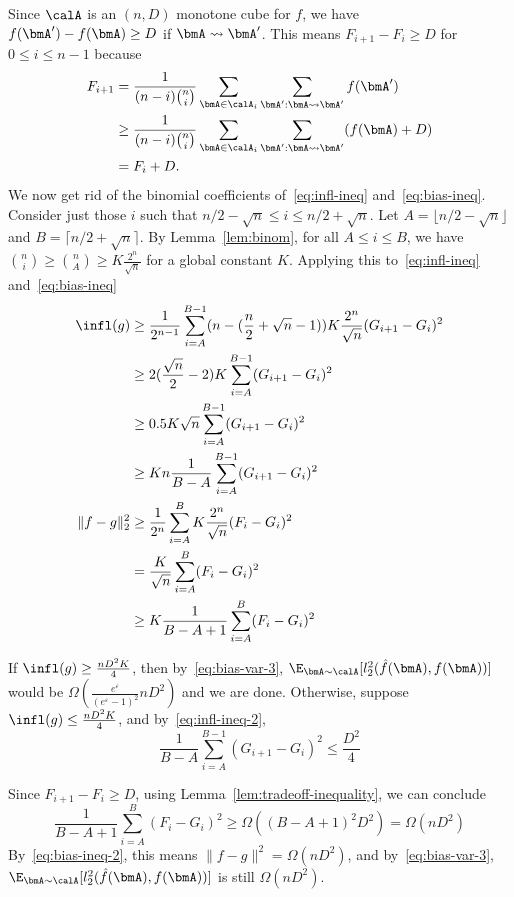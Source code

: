 Since $\calA$ is an $(n, D)$ monotone cube for $f$, we have
$f(\bmA') - f(\bmA) \geq D$ if $\bmA \leadsto \bmA'$. 
This means $F_{i+1}-F_i \geq D$ for $0 \leq i \leq n-1$ 
because 
\begin{align*}
F_{i+1} 
&= \frac{1}{(n-i)\binom{n}{i}} \sum_{\bmA \in \calA_i} \sum_{\bmA': \bmA \leadsto \bmA'} f(\bmA') \\
&\geq \frac{1}{(n-i)\binom{n}{i}} \sum_{\bmA \in \calA_i} \sum_{\bmA': \bmA \leadsto \bmA'} (f(\bmA)+D) \\
&= F_i+D.
\end{align*}
We now get rid of the binomial coefficients of~\eqref{eq:infl-ineq} and~\eqref{eq:bias-ineq}. Consider just those $i$ such that $n/2 - \sqrt{n} \leq i \leq n/2 + \sqrt{n}$. Let $A = \lfloor n/2-\sqrt{n}\rfloor$ and $B = \lceil n/2+\sqrt{n} \rceil$.
By Lemma~\ref{lem:binom}, for all $A \leq i \leq B$, we have $\binom{n}{i} \geq
\binom{n}{A} \geq K\frac{2^n}{\sqrt{n}}$ for a global constant $K$. Applying
this to~\eqref{eq:infl-ineq} and~\eqref{eq:bias-ineq}
\begin{align}
    \infl(g) &\geq \frac{1}{2^{n-1}} \sum_{i=A}^{B-1} 
    (n - (\frac{n}{2} + \sqrt{n} - 1))
    K \frac{2^n}{\sqrt{n}} (G_{i+1} - G_{i})^2 \nonumber \\ 
    &\geq 2 
    (\frac{\sqrt{n}}{2} - 2)
    K \sum_{i=A}^{B-1} (G_{i+1} - G_i)^2 \nonumber \\
    &\geq 0.5 K \sqrt{n} \sum_{i=A}^{B-1} (G_{i+1} - G_i)^2 \nonumber \\
    &\geq K n \frac{1}{B-A} \sum_{i=A}^{B-1} (G_{i+1} - G_i)^2
    \label{eq:infl-ineq-2} \\
    \|f - g\|_2^2 &\geq \frac{1}{2^n} \sum_{i=A}^{B} K \frac{2^n}{\sqrt{n}} (F_i
    - G_i)^2 \nonumber \\
    &= \frac{K}{\sqrt{n}} \sum_{i=A}^{B} (F_i - G_i)^2 \nonumber \\
    &\geq K \frac{1}{B-A+1} \sum_{i=A}^{B} (F_i - G_i)^2 \label{eq:bias-ineq-2}
\end{align}

If $\infl(g) \geq \frac{nD^2K}{4}$, then by~\eqref{eq:bias-var-3}, $\E_{\bmA
\sim \calA}[l_2^2(\hat{f}(\bmA),f(\bmA))]$ would be
$\Omega(\frac{e^\varepsilon}{(e^\varepsilon-1)^2}nD^2)$ and we are done.
Otherwise, suppose $\infl(g) \leq \frac{nD^2K}{4}$, and
by~\eqref{eq:infl-ineq-2},
\[
    \frac{1}{B-A} \sum_{i=A}^{B-1} (G_{i+1} - G_i)^2 \leq \frac{D^2}{4}
\]

Since $F_{i+1} - F_i \geq D$, using Lemma~\ref{lem:tradeoff-inequality}, we can conclude
\[
    \frac{1}{B-A+1} \sum_{i=A}^{B} (F_i - G_i)^2 \geq \Omega((B-A+1)^2 D^2) = \Omega(nD^2)
\]
By~\eqref{eq:bias-ineq-2}, this means $\|f-g\|^2 = \Omega (nD^2)$, and
by~\eqref{eq:bias-var-3}, $\E_{\bmA \sim \calA} [l_2^2(\hat{f}(\bmA),f(\bmA))]$ is 
still $\Omega(nD^2)$.

